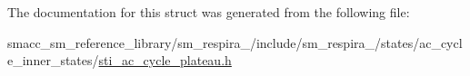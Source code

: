 The documentation for this struct was generated from the following file\+:\begin{DoxyCompactItemize}
\item 
smacc\+\_\+sm\+\_\+reference\+\_\+library/sm\+\_\+respira\+\_/include/sm\+\_\+respira\+\_/states/ac\+\_\+cycle\+\_\+inner\+\_\+states/\hyperlink{sti__ac__cycle__plateau_8h}{sti\+\_\+ac\+\_\+cycle\+\_\+plateau.\+h}\end{DoxyCompactItemize}
